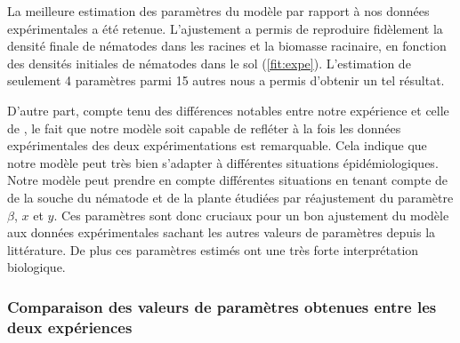 	 
	    
	 La meilleure estimation des paramètres du modèle par rapport à nos données expérimentales a été retenue.
L'ajustement  a permis de reproduire  fidèlement la densité finale de nématodes  dans les racines et la biomasse racinaire, en fonction des densités initiales  de nématodes dans le sol (\autoref{fit:expe}).   
L'estimation de seulement 4 paramètres parmi 15 autres nous a permis d'obtenir un tel résultat. 
	 
	 D'autre part, compte tenu des  différences notables entre notre expérience et celle de \citet{Ehwaeti1998}, le fait que notre modèle soit capable de refléter à la fois  les données expérimentales des deux expérimentations est remarquable.  Cela indique que notre modèle peut très bien s'adapter à différentes situations épidémiologiques. Notre modèle peut prendre en compte différentes situations  en tenant compte de  de la souche du nématode  et de la plante étudiées par réajustement du paramètre $\beta$, $x$ et $y$. Ces paramètres sont donc cruciaux pour un bon ajustement du modèle aux données expérimentales sachant les autres valeurs de paramètres depuis la littérature. De plus ces paramètres estimés ont une très forte interprétation biologique. 
	 
	\subsubsection{Comparaison des valeurs de paramètres obtenues entre les deux expériences}
	 
